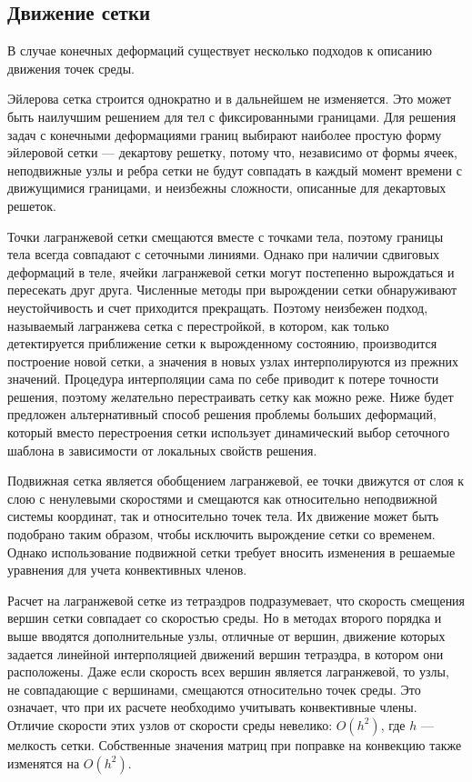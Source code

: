 \clearpage
\newpage

\subsection{Движение сетки}


В случае конечных деформаций существует несколько подходов к описанию движения точек среды.

Эйлерова сетка строится однократно и в дальнейшем не изменяется. Это может быть наилучшим решением для тел с фиксированными границами. Для решения задач с конечными деформациями границ выбирают наиболее простую форму эйлеровой сетки — декартову решетку, потому что, независимо от формы ячеек, неподвижные узлы и ребра сетки не будут совпадать в каждый момент времени с движущимися границами, и неизбежны сложности, описанные для декартовых решеток.

Точки лагранжевой сетки смещаются вместе с точками тела, поэтому границы тела всегда совпадают с сеточными линиями. Однако при наличии сдвиговых деформаций в теле, ячейки лагранжевой сетки могут постепенно вырождаться и пересекать друг друга. Численные методы при вырождении сетки обнаруживают неустойчивость и счет приходится прекращать. Поэтому неизбежен подход, называемый лагранжева сетка с перестройкой, в котором, как только детектируется приближение сетки к вырожденному состоянию, производится построение новой сетки, а значения в новых узлах интерполируются из прежних значений. Процедура интерполяции сама по себе приводит к потере точности решения, поэтому желательно перестраивать сетку как можно реже. Ниже будет предложен альтернативный способ решения проблемы больших деформаций, который вместо перестроения сетки использует динамический выбор сеточного шаблона в зависимости от локальных свойств решения.

Подвижная сетка является обобщением лагранжевой, ее точки движутся от слоя к слою с ненулевыми скоростями и смещаются как относительно неподвижной системы координат, так и относительно точек тела. Их движение может быть подобрано таким образом, чтобы исключить вырождение сетки со временем. Однако использование подвижной сетки требует вносить изменения в решаемые уравнения для учета конвективных членов.

Расчет на лагранжевой сетке из тетраэдров подразумевает, что скорость смещения вершин сетки совпадает со скоростью среды. Но в методах второго порядка и выше вводятся дополнительные узлы, отличные от вершин, движение которых задается линейной интерполяцией движений вершин тетраэдра, в котором они расположены. Даже если скорость всех вершин является лагранжевой, то узлы, не совпадающие с вершинами, смещаются относительно точек среды. Это означает, что при их расчете необходимо учитывать конвективные члены. Отличие скорости этих узлов от скорости среды невелико: $O(h^2)$, где $h$ — мелкость сетки. Собственные значения матриц при поправке на конвекцию также изменятся на $O(h^2)$.

